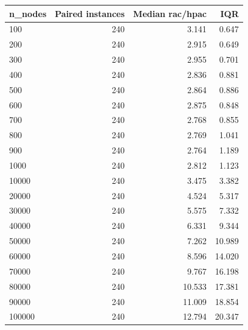 \begin{tabular}{lrrr}
\toprule
n\_nodes & Paired instances & Median rac/hpac & IQR \\
\midrule
100 & 240 & 3.141 & 0.647 \\
200 & 240 & 2.915 & 0.649 \\
300 & 240 & 2.955 & 0.701 \\
400 & 240 & 2.836 & 0.881 \\
500 & 240 & 2.864 & 0.886 \\
600 & 240 & 2.875 & 0.848 \\
700 & 240 & 2.768 & 0.855 \\
800 & 240 & 2.769 & 1.041 \\
900 & 240 & 2.764 & 1.189 \\
1000 & 240 & 2.812 & 1.123 \\
10000 & 240 & 3.475 & 3.382 \\
20000 & 240 & 4.524 & 5.317 \\
30000 & 240 & 5.575 & 7.332 \\
40000 & 240 & 6.331 & 9.344 \\
50000 & 240 & 7.262 & 10.989 \\
60000 & 240 & 8.596 & 14.020 \\
70000 & 240 & 9.767 & 16.198 \\
80000 & 240 & 10.533 & 17.381 \\
90000 & 240 & 11.009 & 18.854 \\
100000 & 240 & 12.794 & 20.347 \\
\bottomrule
\end{tabular}

